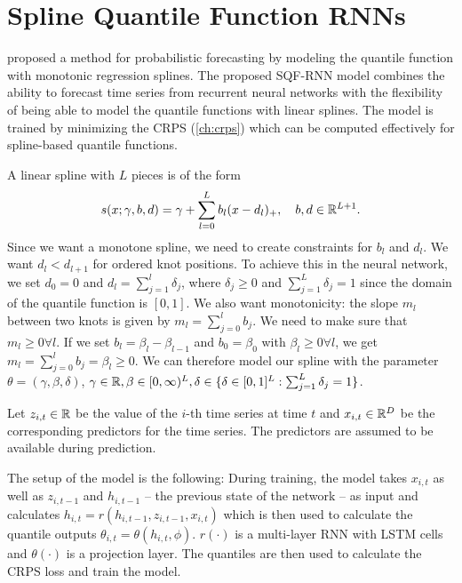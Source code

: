 \section{Spline Quantile Function RNNs}
\label{sec:sqf-rnn}

\Textcite{Gasthaus2019} proposed a method for probabilistic forecasting by modeling 
the quantile function with monotonic regression splines. 
The proposed SQF-RNN model combines the ability to forecast time series 
from recurrent neural networks with the flexibility of being able to 
model the quantile functions with linear splines. 
The model is trained by minimizing the CRPS (\ref{ch:crps}) which can be computed effectively 
for spline-based quantile functions.

A linear spline with \(L\) pieces is of the form 
\[ s(x; \gamma, b, d) = \gamma + \sum_{l=0}^L b_l (x - d_l)_+, 
\quad b, d \in \mathbb{R}^{L+1}. \]
Since we want a monotone spline, we need to create constraints for \(b_l\) and \(d_l\).
We want \(d_l < d_{l+1}\) for ordered knot positions. To achieve this 
in the neural network, we set \(d_0 = 0\) and \(d_l = \sum_{j=1}^l \delta_j\), 
where \(\delta_j \geq 0\) and \(\sum_{j=1}^L \delta_j = 1\) since the domain 
of the quantile function is \([0, 1]\). 
We also want monotonicity: the slope \(m_l\) between two knots is given by 
\(m_l = \sum_{j=0}^l b_j\). We need to make sure that \(m_l \geq 0 \forall l\).
If we set \(b_l = \beta_l - \beta_{l-1}\) and \(b_0 = \beta_0\) with \(\beta_l \geq 0 \forall l\), 
we get \(m_l = \sum_{j=0}^l b_j = \beta_l \geq 0\).
We can therefore model our spline with the parameter 
\(\theta = (\gamma, \beta, \delta)\), \(\gamma \in \mathbb{R}, \beta \in [0,\infty)^{L}, 
\delta \in \{ \delta \in [0,1]^L: \sum_{j=1}^L \delta_j = 1 \}\).

Let \(z_{i,t} \in \mathbb{R}\) be the value of the \(i\)-th time series at time \(t\) and 
\(x_{i,t} \in \mathbb{R}^D\) be the corresponding predictors for the time series. 
The predictors are assumed to be available during prediction. 

The setup of the model is the following: 
During training, the model takes \(x_{i,t}\) as well as \(z_{i, t-1}\) 
and \(h_{i, t-1}\) -- the previous state of the network -- 
as input and calculates \(h_{i,t} = r(h_{i, t-1}, z_{i, t-1}, x_{i, t})\)
which is then used to calculate the quantile outputs 
\(\theta_{i,t} = \theta(h_{i,t}, \phi)\).
\(r(\cdot)\) is a multi-layer RNN with LSTM cells and \(\theta(\cdot)\) 
is a projection layer.
The quantiles are then used to calculate the CRPS loss and train the model.